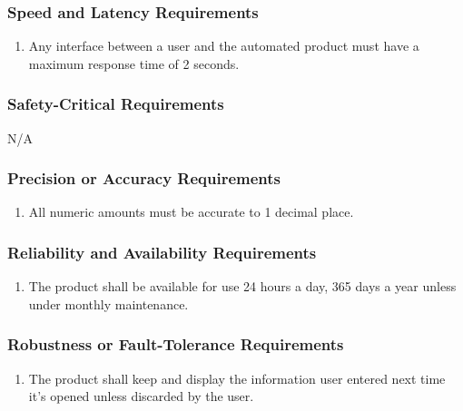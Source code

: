 \documentclass[]{article}
\begin{document}
\subsubsection{Speed and Latency Requirements}
\label{ssub:speed_and_latency_requirements}
\begin{enumerate}[{PR}1. ]
	\item Any interface between a user and the automated product must have a maximum response time of 2 seconds.
\end{enumerate}

\subsubsection{Safety-Critical Requirements}
\label{ssub:safety_critical_requirements}
N/A

\subsubsection{Precision or Accuracy Requirements}
\label{ssub:precision_or_accuracy_requirements}
\begin{enumerate}[{PR}2. ]
	\item All numeric amounts must be accurate to 1 decimal place.
\end{enumerate}

\subsubsection{Reliability and Availability Requirements}
\label{ssub:reliability_and_availability_requirements}
\begin{enumerate}[{PR}3. ]
	\item The product shall be available for use 24 hours a day, 365 days a year unless under monthly maintenance.
\end{enumerate}

\subsubsection{Robustness or Fault-Tolerance Requirements}
\label{ssub:robustness_or_fault_tolerance_requirements}
\begin{enumerate}[{PR}4. ]
	\item The product shall keep and display the information user entered next time it's opened unless discarded by the user.
\end{enumerate}
\end{document}

